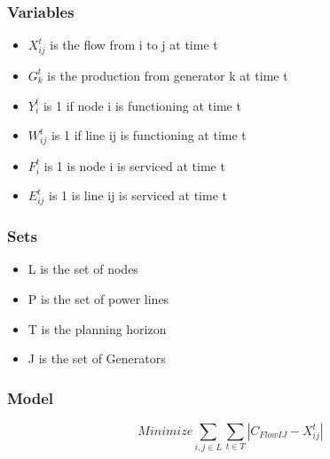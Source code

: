 \documentclass{article}
\begin{document}
	\subsubsection{Variables}
	\begin{itemize}
		
		\item $X_{ij}^{t}$ is the flow from i to j at time t
		\item $G_{k}^t$ is the production from generator k at time t
		\item $Y_i^t$ is 1 if node i is functioning at time t
		\item $W_{ij}^t$ is 1 if line ij is functioning at time t
		\item $F_i^t$ is 1 is node i is serviced at time t 
		\item $E_{ij}^t$ is 1 is line ij is serviced at time t	
	\end{itemize}
	\subsubsection{Sets}
	\begin{itemize}
		\item L is the set of nodes
		\item P is the set of power lines
		\item T is the planning horizon
		\item J is the set of Generators
	\end{itemize}
	\subsubsection{Model}
	$$	Minimize \sum_{i,j \in L} \sum_{t \in T} |C_{FlowIJ}-X_{ij}^t| $$
	
\end{document}
